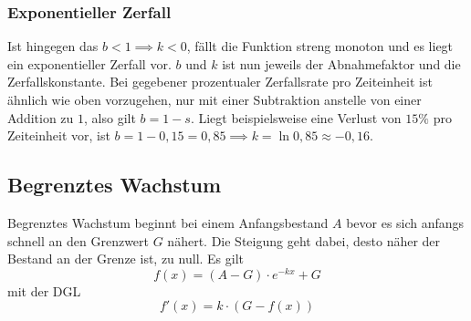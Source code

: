 \documentclass{article}
\begin{document}
\subsubsection{Exponentieller Zerfall}
\begin{minipage}{\dimexpr\textwidth-5cm}
Ist hingegen das ${b < 1 \implies k < 0}$, fällt die Funktion streng monoton und es liegt ein exponentieller Zerfall vor. $b$ und $k$ ist nun jeweils der Abnahmefaktor und die Zerfallskonstante. Bei gegebener prozentualer Zerfallsrate pro Zeiteinheit ist ähnlich wie oben vorzugehen, nur mit einer Subtraktion anstelle von einer Addition zu $1$, also gilt ${b=1-s}$. \newline
Liegt beispielsweise eine Verlust von $15\%$ pro Zeiteinheit vor, ist ${b=1-0,15=0,85 \implies k=\ln {0,85} \approx -0,16}$. 
\end{minipage}
\hfill
\begin{minipage}{5cm} 
 \centering
\end{minipage} 
 
\subsection{Begrenztes Wachstum}
\begin{minipage}{5cm} 
  \centering
\end{minipage}
\hfill
\begin{minipage}{\dimexpr\textwidth-5cm} 
Begrenztes Wachstum beginnt bei einem Anfangsbestand $A$ bevor es sich anfangs schnell an den Grenzwert $G$ nähert. Die Steigung geht dabei, desto näher der Bestand an der Grenze ist, zu null. Es gilt
\[
 f(x) = (A-G) \cdot e^{-kx} + G 
\]
mit der DGL
\[
 f'(x) = k \cdot (G - f(x)) 
\]
\end{minipage}
 
\end{document}
